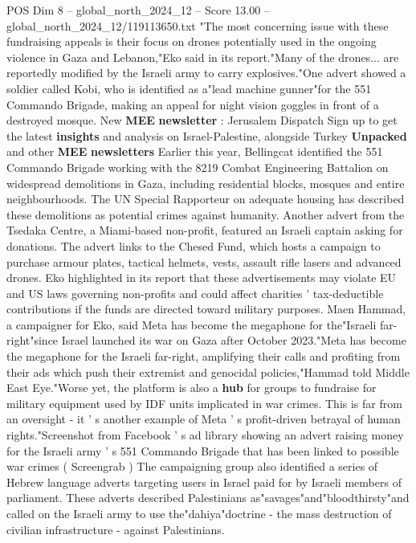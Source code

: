 \begin{textsample}{POS Dim 8 – global\_north\_2024\_12 – Score 13.00 – global\_north\_2024\_12/119113650.txt}  \label{ex:f8_pos_095}
"The most concerning issue with these fundraising appeals is their focus on drones potentially used in the ongoing violence in Gaza and Lebanon,"Eko said in its report."Many of the drones... are reportedly modified by the Israeli army to carry explosives."One advert showed a soldier called Kobi, who is identified as a"lead machine gunner"for the 551 Commando Brigade, making an appeal for night vision goggles in front of a destroyed mosque.
New \textbf{MEE} \textbf{newsletter} : Jerusalem Dispatch Sign up to get the latest \textbf{insights} and analysis on Israel-Palestine, alongside Turkey \textbf{Unpacked} and other \textbf{MEE} \textbf{newsletters} Earlier this year, Bellingcat identified the 551 Commando Brigade working with the 8219 Combat Engineering Battalion on widespread demolitions in Gaza, including residential blocks, mosques and entire neighbourhoods.
The UN Special Rapporteur on adequate housing has described these demolitions as potential crimes against humanity.
Another advert from the Tsedaka Centre, a Miami-based non-profit, featured an Israeli captain asking for donations.
The advert links to the Chesed Fund, which hosts a campaign to purchase armour plates, tactical helmets, vests, assault rifle lasers and advanced drones.
Eko highlighted in its report that these advertisements may violate EU and US laws governing non-profits and could affect charities ' tax-deductible contributions if the funds are directed toward military purposes.
Maen Hammad, a campaigner for Eko, said Meta has become the megaphone for the"Israeli far-right"since Israel launched its war on Gaza after October 2023."Meta has become the megaphone for the Israeli far-right, amplifying their calls and profiting from their ads which push their extremist and genocidal policies,"Hammad told Middle East Eye."Worse yet, the platform is also a \textbf{hub} for groups to fundraise for military equipment used by IDF units implicated in war crimes.
This is far from an oversight - it ' s another example of Meta ' s profit-driven betrayal of human rights."Screenshot from Facebook ' s ad library showing an advert raising money for the Israeli army ' s 551 Commando Brigade that has been linked to possible war crimes ( Screengrab ) The campaigning group also identified a series of Hebrew language adverts targeting users in Israel paid for by Israeli members of parliament.
These adverts described Palestinians as"savages"and"bloodthirsty"and called on the Israeli army to use the"dahiya"doctrine - the mass destruction of civilian infrastructure - against Palestinians.

\end{textsample}
